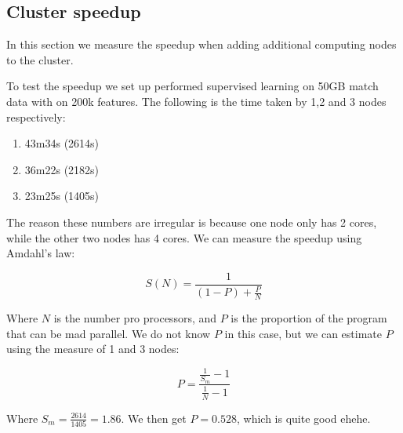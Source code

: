 \subsection{Cluster speedup}
In this section we measure the speedup when adding additional computing nodes to the cluster.

To test the speedup we set up performed supervised learning on 50GB match data with on 200k features. The following is the time taken by 1,2 and 3 nodes respectively:

\begin{enumerate}
    \item 43m34s (2614s)
    \item 36m22s (2182s)
    \item 23m25s (1405s)
\end{enumerate}

The reason these numbers are irregular is because one node only has 2 cores, while the other two nodes has 4 cores. We can measure the speedup using Amdahl's law:

\[S(N) = \frac{1}{(1-P)+\frac{P}{N}}\]

Where $N$ is the number pro processors, and $P$ is the proportion of the program that can be mad parallel. We do not know $P$ in this case, but we can estimate $P$ using the measure of 1 and 3 nodes:

\[P = \frac{\frac{1}{S_m}-1}{\frac{1}{N}-1}  \]

Where \( S_m=\frac{2614}{1405} = 1.86 \). We then get $P = 0.528$, which is quite good ehehe.